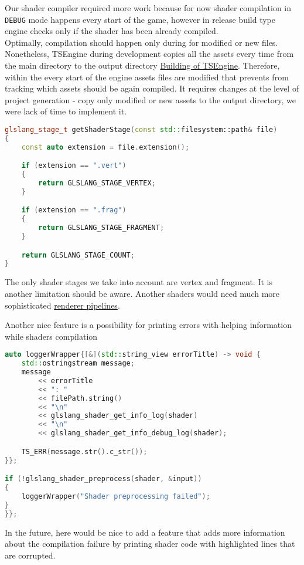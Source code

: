 Our shader compiler required more work because for now shader compilation in \texttt{DEBUG} mode happens every start of the game, however in release build type engine checks only if the shader has been already compiled.\\
Optimally, compilation should happen only during for modified or new files. Nonetheless, TSEngine during development copies all the assets every time from the main directory to the output directory  \hyperref[lst:build]{Building of TSEngine}. Therefore, within the every start of the engine assets files are modified that prevents from tracking which assets should be again compiled. It requires changes at the level of project generation - copy only modified or new assets to the output directory, we were lack of time to implement it.

\begin{lstlisting}[language=c++, caption=Shader Compiler supported shader stages (./engine/src/vulkan\_tools/shaders\_compiler.cpp)]
glslang_stage_t getShaderStage(const std::filesystem::path& file)
{
    const auto extension = file.extension();

    if (extension == ".vert")
    {
        return GLSLANG_STAGE_VERTEX;
    }

    if (extension == ".frag")
    {
        return GLSLANG_STAGE_FRAGMENT;
    }

    return GLSLANG_STAGE_COUNT;
}
\end{lstlisting}
The only shader stages we take into account are vertex and fragment. It is another limitation should be aware. Another shaders would need much more sophisticated \hyperref[sec:renderer]{renderer pipelines}.

Another nice feature is a possibility for printing errors with helping information while shaders compilation
\begin{lstlisting}[language=c++, caption=Shader Compiler logging (./engine/src/vulkan\_tools/shaders\_compiler.cpp)]
auto loggerWrapper{[&](std::string_view errorTitle) -> void {
    std::ostringstream message;
    message
        << errorTitle
        << ": "
        << filePath.string()
        << "\n"
        << glslang_shader_get_info_log(shader)
        << "\n"
        << glslang_shader_get_info_debug_log(shader);

    TS_ERR(message.str().c_str());
}};

if (!glslang_shader_preprocess(shader, &input))
{
    loggerWrapper("Shader preprocessing failed");
}
}};
\end{lstlisting}
In the future, here would be nice to add a feature that adds more information about the compilation failure by printing shader code with highlighted lines that are corrupted. 

